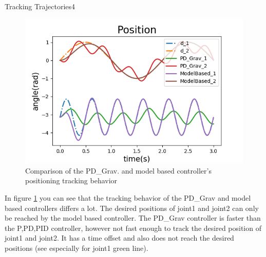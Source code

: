 \begin{questions}
\begin{question}{Tracking Trajectories}{4}
\begin{answer}
				\begin{minipage}{0.7\textwidth}
					\begin{figure}[H]
						\includegraphics[width=1\textwidth]{img/2dpos2.png} 
						\caption{\label{fig:2dpos2} Comparison of the PD\_Grav. and model based controller's positioning tracking behavior}
					\end{figure}
				\end{minipage} \hfill
				\begin{minipage}{0.25\textwidth}
					In figure \ref{fig:2dpos2} you can see that the tracking behavior of the PD\_Grav and model based controllers differs a lot. The desired positions of joint1 and joint2 can only be reached by the model based controller. The PD\_Grav controller is faster than the P,PD,PID controller, however not fast enough to track the desired position of joint1 and joint2. It has a time offset and also does not reach the desired positions (see especially for joint1 green line).
				\end{minipage}
				

\end{answer}
\end{question}
\end{questions}
